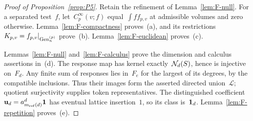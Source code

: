 \begin{proof}[Proof of Proposition~\ref{prop:P5}]
Retain the refinement of Lemma~\ref{lem:F-null}. For a separated test~$f$, let~$C_p^\infty(v;f)$ equal~$\int f f_{p,v}$ at admissible volumes and zero otherwise. Lemma~\ref{lem:F-compactness} proves~(a), and its restrictions~$K_{p,v}=f_{p,v}|_{\mathrm{Gen}_{n}^{(p)}}$ prove~(b). Lemma~\ref{lem:F-euclidean} proves~(c).

Lemmas~\ref{lem:F-null} and~\ref{lem:F-calculus} prove the dimension and calculus assertions in~(d). The response map has kernel exactly~$\mathcal{N}_{d}(S)$, hence is injective on~$F_d$. Any finite sum of responses lies in~$F_e$ for the largest of its degrees, by the compatible inclusions. Thus their images form the asserted directed union~$\mathcal L$; quotient surjectivity supplies token representatives. The distinguished coefficient~$\mathbf u_d=a_{m_{\rm ref}(d)}^d\mathbf1$ has eventual lattice insertion~$1$, so its class is~$\mathbf{1}_{d}$. Lemma~\ref{lem:F-repetition} proves~(e).
\end{proof}
